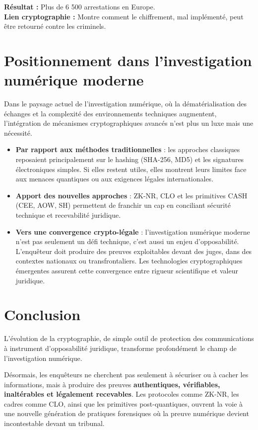 \documentclass[11pt]{article}
\begin{document}
\begin{itemize}
\begin{itemize}
\textbf{Résultat :} Plus de 6 500 arrestations en Europe.\\

\textbf{Lien cryptographie :} Montre comment le chiffrement, mal implémenté, peut être retourné contre les criminels.

\end{itemize}

\section{Positionnement dans l’investigation numérique moderne}

Dans le paysage actuel de l’investigation numérique, où la dématérialisation des échanges et la complexité des environnements techniques augmentent, l’intégration de mécanismes cryptographiques avancés n’est plus un luxe mais une nécessité.

\begin{itemize}
    \item \textbf{Par rapport aux méthodes traditionnelles} : les approches classiques reposaient principalement sur le hashing (SHA-256, MD5) et les signatures électroniques simples. Si elles restent utiles, elles montrent leurs limites face aux menaces quantiques ou aux exigences légales internationales.
    \item \textbf{Apport des nouvelles approches} : ZK-NR, CLO et les primitives CASH (CEE, AOW, SH) permettent de franchir un cap en conciliant sécurité technique et recevabilité juridique.
    \item \textbf{Vers une convergence crypto-légale} : l’investigation numérique moderne n’est pas seulement un défi technique, c’est aussi un enjeu d’opposabilité. L’enquêteur doit produire des preuves exploitables devant des juges, dans des contextes nationaux ou transfrontaliers. Les technologies cryptographiques émergentes assurent cette convergence entre rigueur scientifique et valeur juridique.
\end{itemize}
\end{itemize}
\newpage
\section*{Conclusion}
L’évolution de la cryptographie, de simple outil de protection des communications à instrument d’opposabilité juridique, transforme profondément le champ de l’investigation numérique.

Désormais, les enquêteurs ne cherchent pas seulement à sécuriser ou à cacher les informations, mais à produire des preuves \textbf{authentiques, vérifiables, inaltérables et légalement recevables}. Les protocoles comme ZK-NR, les cadres comme CLO, ainsi que les primitives post-quantiques, ouvrent la voie à une nouvelle génération de pratiques forensiques où la preuve numérique devient incontestable devant un tribunal.
\end{document}

